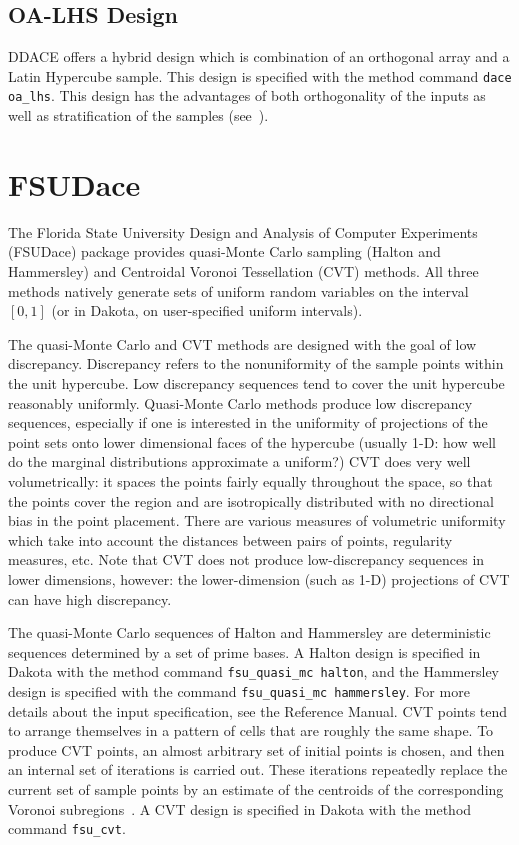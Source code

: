 \subsection{OA-LHS Design}\label{dace:oalhs}

DDACE offers a hybrid design which is combination of an orthogonal
array and a Latin Hypercube sample. This design is specified with the
method command \texttt{dace oa\_lhs}. This design has the advantages
of both orthogonality of the inputs as well as stratification of the
samples (see~\cite{Owe92}).

\section{FSUDace}\label{dace:fsudace}

The Florida State University Design and Analysis of Computer
Experiments (FSUDace) package provides quasi-Monte Carlo sampling
(Halton and Hammersley) and Centroidal Voronoi Tessellation (CVT)
methods. All three methods natively generate sets of uniform random
variables on the interval $[0,1]$ (or in Dakota, on user-specified
uniform intervals).

The quasi-Monte Carlo and CVT methods are designed with the goal of
low discrepancy. Discrepancy refers to the nonuniformity of the sample
points within the unit hypercube. Low discrepancy sequences tend to
cover the unit hypercube reasonably uniformly. Quasi-Monte Carlo
methods produce low discrepancy sequences, especially if one is
interested in the uniformity of projections of the point sets onto
lower dimensional faces of the hypercube (usually 1-D: how well do the
marginal distributions approximate a uniform?) CVT does very well
volumetrically: it spaces the points fairly equally throughout the
space, so that the points cover the region and are isotropically
distributed with no directional bias in the point placement. There are
various measures of volumetric uniformity which take into account the
distances between pairs of points, regularity measures, etc. Note that
CVT does not produce low-discrepancy sequences in lower dimensions,
however: the lower-dimension (such as 1-D) projections of CVT can have
high discrepancy.

The quasi-Monte Carlo sequences of Halton and Hammersley are
deterministic sequences determined by a set of prime bases.
A Halton design is specified in Dakota with the method command 
\texttt{fsu\_quasi\_mc halton}, and the Hammersley design is 
specified with the command \texttt{fsu\_quasi\_mc hammersley}.
For more details about the input specification, see the Reference Manual.
CVT points tend to arrange themselves in a pattern
of cells that are roughly the same shape. To produce CVT
points, an almost arbitrary set of initial points is chosen, and then
an internal set of iterations is carried out. These iterations
repeatedly replace the current set of sample points by an estimate of
the centroids of the corresponding Voronoi subregions~\cite{Du99}.
A CVT design is specified in Dakota with the method command
\texttt{fsu\_cvt}.

